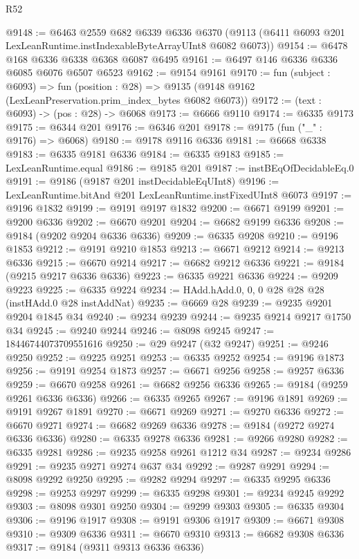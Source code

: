 \begin{lexlean}{R52}
\begin{coremodule}
@9148 := @6463
    @2559
    @682
    @6339
    @6336
    @6370
    (@9113 (@6411 @6093 @201 LexLeanRuntime.instIndexableByteArrayUInt8 @6082 @6073))
@9154 := @6478 @168 @6336 @6338 @6368 @6087 @6495
@9161 := @6497 @146 @6336 @6336 @6085 @6076 @6507 @6523
@9162 := @9154 @9161
@9170 := fun (subject : @6093) =>
  fun (position : @28) => @9135 (@9148 @9162 (LexLeanPreservation.prim_index_bytes @6082 @6073))
@9172 := (text : @6093) -> (pos : @28) -> @6068
@9173 := @6666 @9110
@9174 := @6335 @9173
@9175 := @6344 @201
@9176 := @6346 @201
@9178 := @9175 (fun ("_" : @9176) => @6068)
@9180 := @9178 @9116 @6336
@9181 := @6668 @6338
@9183 := @6335 @9181 @6336
@9184 := @6335 @9183
@9185 := LexLeanRuntime.equal
@9186 := @9185 @201
@9187 := instBEqOfDecidableEq.{0}
@9191 := @9186 (@9187 @201 instDecidableEqUInt8)
@9196 := LexLeanRuntime.bitAnd @201 LexLeanRuntime.instFixedUInt8 @6073
@9197 := @9196 @1832
@9199 := @9191 @9197 @1832
@9200 := @6671 @9199
@9201 := @9200 @6336
@9202 := @6670 @9201
@9204 := @6682 @9199 @6336
@9208 := @9184 (@9202 @9204 @6336 @6336)
@9209 := @6335 @9208
@9210 := @9196 @1853
@9212 := @9191 @9210 @1853
@9213 := @6671 @9212
@9214 := @9213 @6336
@9215 := @6670 @9214
@9217 := @6682 @9212 @6336
@9221 := @9184 (@9215 @9217 @6336 @6336)
@9223 := @6335 @9221 @6336
@9224 := @9209 @9223
@9225 := @6335 @9224
@9234 := HAdd.hAdd.{0, 0, 0} @28 @28 @28 (instHAdd.{0} @28 instAddNat)
@9235 := @6669 @28
@9239 := @9235 @9201 @9204 @1845 @34
@9240 := @9234 @9239
@9244 := @9235 @9214 @9217 @1750 @34
@9245 := @9240 @9244
@9246 := @8098 @9245
@9247 := 18446744073709551616
@9250 := @29 @9247 (@32 @9247)
@9251 := @9246 @9250
@9252 := @9225 @9251
@9253 := @6335 @9252
@9254 := @9196 @1873
@9256 := @9191 @9254 @1873
@9257 := @6671 @9256
@9258 := @9257 @6336
@9259 := @6670 @9258
@9261 := @6682 @9256 @6336
@9265 := @9184 (@9259 @9261 @6336 @6336)
@9266 := @6335 @9265
@9267 := @9196 @1891
@9269 := @9191 @9267 @1891
@9270 := @6671 @9269
@9271 := @9270 @6336
@9272 := @6670 @9271
@9274 := @6682 @9269 @6336
@9278 := @9184 (@9272 @9274 @6336 @6336)
@9280 := @6335 @9278 @6336
@9281 := @9266 @9280
@9282 := @6335 @9281
@9286 := @9235 @9258 @9261 @1212 @34
@9287 := @9234 @9286
@9291 := @9235 @9271 @9274 @637 @34
@9292 := @9287 @9291
@9294 := @8098 @9292 @9250
@9295 := @9282 @9294
@9297 := @6335 @9295 @6336
@9298 := @9253 @9297
@9299 := @6335 @9298
@9301 := @9234 @9245 @9292
@9303 := @8098 @9301 @9250
@9304 := @9299 @9303
@9305 := @6335 @9304
@9306 := @9196 @1917
@9308 := @9191 @9306 @1917
@9309 := @6671 @9308
@9310 := @9309 @6336
@9311 := @6670 @9310
@9313 := @6682 @9308 @6336
@9317 := @9184 (@9311 @9313 @6336 @6336)

\end{coremodule}
\end{lexlean}
